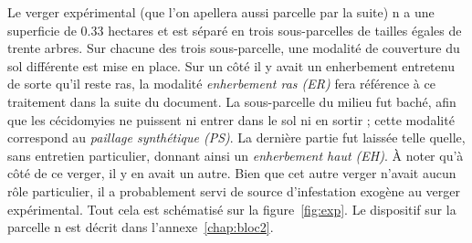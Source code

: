 Le verger expérimental (que l'on apellera aussi parcelle par la suite) n a une superficie de 0.33 hectares et est séparé en trois sous-parcelles de tailles égales de trente arbres.
Sur chacune des trois sous-parcelle, une modalité de couverture du sol différente est mise en place.
Sur un côté il y avait un enherbement entretenu de sorte qu'il reste ras, la modalité \emph{enherbement ras (ER)} fera référence à ce traitement dans la suite du document.
La sous-parcelle du milieu fut baché, afin que les cécidomyies ne puissent ni entrer dans le sol ni en sortir ; cette modalité correspond au \emph{paillage synthétique (PS)}. 
La dernière partie fut laissée telle quelle, sans entretien particulier, donnant ainsi un \emph{enherbement haut (EH)}.
À noter qu'à côté de ce verger, il y en avait un autre.
Bien que cet autre verger n'avait aucun rôle particulier, il a probablement servi de source d'infestation exogène au verger expérimental.
Tout cela est schématisé sur la figure~\ref{fig:exp}.
Le dispositif sur la parcelle n est décrit dans l'annexe~\ref{chap:bloc2}.
